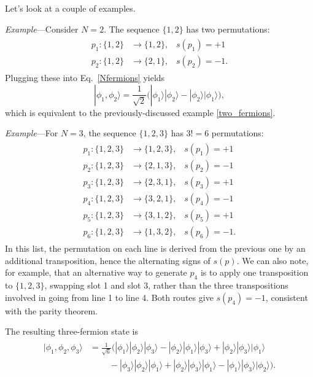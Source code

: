 \documentclass[pra,12pt]{revtex4-2}
\begin{document}
Let's look at a couple of examples.

\begin{framed}
\noindent
\textit{Example}---Consider $N=2$.  The sequence $\{1,2\}$
has two permutations:
\begin{align}
  \begin{aligned}
    p_1 : \{1,2\} &\rightarrow \{1,2\}, \;\;\;s(p_1) = +1 \\ p_2 : \{1,2\} &\rightarrow \{2,1\}, \;\;\;s(p_2) = -1.\end{aligned}
\end{align}
Plugging these into Eq.~\eqref{Nfermions} yields
\begin{equation*}
  |\phi_1,\phi_2\rangle = \frac{1}{\sqrt{2}}
  \Big(|\phi_1\rangle|\phi_2\rangle - |\phi_2\rangle|\phi_1\rangle\Big),
\end{equation*}
which is equivalent to the previously-discussed example
\eqref{two_fermions}.
\end{framed}

\begin{framed}
\noindent
\textit{Example}---For $N=3$, the sequence $\{1,2,3\}$ has $3!=6$ permutations:
\begin{align}
  \begin{aligned}
  p_1 : \{1,2,3\} &\rightarrow \{1,2,3\}, \;\;\;s(p_1) = +1 \\
  p_2 : \{1,2,3\} &\rightarrow \{2,1,3\}, \;\;\;s(p_2) = -1 \\
  p_3 : \{1,2,3\} &\rightarrow \{2,3,1\}, \;\;\;s(p_3) = +1 \\
  p_4 : \{1,2,3\} &\rightarrow \{3,2,1\}, \;\;\;s(p_4) = -1 \\
  p_5 : \{1,2,3\} &\rightarrow \{3,1,2\}, \;\;\;s(p_5) = +1 \\
  p_6 : \{1,2,3\} &\rightarrow \{1,3,2\}, \;\;\;s(p_6) = -1.\end{aligned}
\end{align}
In this list, the permutation on each line is derived from the
previous one by an additional transposition, hence the alternating
signs of $s(p)$.  We can also note, for example, that an alternative
way to generate $p_4$ is to apply one transposition to $\{1,2,3\}$,
swapping slot 1 and slot 3, rather than the three transpositions
involved in going from line 1 to line 4.  Both routes give $s(p_4) =
-1$, consistent with the parity theorem.

The resulting three-fermion state is
\begin{align}
  \begin{aligned}
    |\phi_1, \phi_2, \phi_3\rangle
    &= \frac{1}{\sqrt{6}} \Big(
    |\phi_1\rangle |\phi_2\rangle |\phi_3\rangle
    - |\phi_2\rangle |\phi_1\rangle |\phi_3\rangle
    + |\phi_2\rangle |\phi_3\rangle |\phi_1\rangle \\
    & \qquad\; 
    - |\phi_3\rangle |\phi_2\rangle |\phi_1\rangle
    + |\phi_2\rangle |\phi_3\rangle |\phi_1\rangle
    - |\phi_1\rangle |\phi_3\rangle |\phi_2\rangle \Big).
  \end{aligned}
\end{align}
\end{framed}
\end{document}
